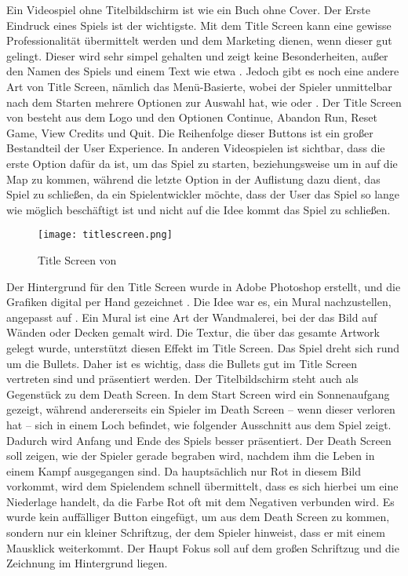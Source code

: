 Ein Videospiel ohne Titelbildschirm ist wie ein Buch ohne Cover. Der Erste Eindruck eines Spiels ist der wichtigste. Mit dem Title Screen kann eine gewisse Professionalität übermittelt werden und dem Marketing dienen, wenn dieser gut gelingt. Dieser wird sehr simpel gehalten und zeigt keine Besonderheiten, außer den Namen des Spiels und einem Text wie etwa
.
Jedoch gibt es noch eine andere Art von Title Screen, nämlich das Menü-Basierte, wobei der Spieler unmittelbar nach dem Starten mehrere Optionen zur Auswahl hat, wie
 oder .  Der Title Screen von \FF besteht
aus dem \FF Logo und den Optionen Continue, Abandon Run, Reset Game, View Credits und Quit. Die Reihenfolge dieser Buttons ist ein großer Bestandteil der User Experience. In anderen Videospielen ist sichtbar, dass die erste Option dafür da ist, um das Spiel zu starten, beziehungsweise um in \FF auf die Map zu kommen, während die letzte Option in der Auflistung dazu dient, das Spiel zu schließen, da ein Spielentwickler möchte, dass der User das Spiel so lange wie möglich beschäftigt ist und nicht auf die Idee kommt das Spiel zu schließen.

\begin{figure}[H]
    \centering
    \texttt{[image: titlescreen.png]}
    \caption{Title Screen von \FF}
\end{figure}

Der Hintergrund für den Title Screen wurde in Adobe Photoshop erstellt, und die Grafiken digital per Hand gezeichnet
. Die Idee war es, ein Mural nachzustellen, angepasst auf \FF. Ein Mural ist eine Art der Wandmalerei, bei der das
Bild auf Wänden oder Decken gemalt wird.  Die Textur, die über das gesamte Artwork gelegt wurde,
unterstützt diesen
Effekt im Title Screen. Das Spiel dreht sich rund um die Bullets. Daher ist es wichtig, dass die Bullets gut im Title Screen vertreten sind und präsentiert werden. Der Titelbildschirm steht auch als Gegenstück zu dem Death Screen. In dem Start Screen wird ein Sonnenaufgang gezeigt, während andererseits ein Spieler im Death Screen – wenn dieser verloren hat – sich in einem Loch befindet, wie folgender Ausschnitt aus dem Spiel zeigt. Dadurch wird Anfang und Ende des Spiels besser präsentiert. Der Death Screen soll zeigen, wie der Spieler gerade begraben wird, nachdem ihm die Leben in einem Kampf ausgegangen sind. Da hauptsächlich nur Rot in diesem Bild vorkommt, wird dem Spielendem schnell übermittelt, dass es sich hierbei um eine Niederlage handelt, da die Farbe Rot oft mit dem Negativen verbunden wird. Es wurde kein auffälliger Button eingefügt, um aus dem Death Screen zu kommen, sondern nur ein kleiner Schriftzug, der dem Spieler hinweist, dass er mit einem Mausklick weiterkommt. Der Haupt Fokus soll auf dem großen Schriftzug
 und die Zeichnung im Hintergrund liegen.


